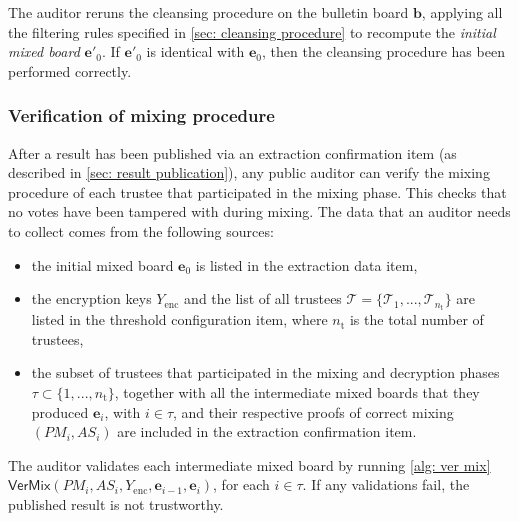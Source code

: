 The auditor reruns the cleansing procedure on the bulletin board $\boldsymbol{b}$, applying all the filtering rules specified in \cref{sec: cleansing procedure} to recompute the \textit{initial mixed board} $\boldsymbol{e'}_0$. If $\boldsymbol{e'}_0$ is identical with $\boldsymbol{e}_0$, then the cleansing procedure has been performed correctly.


\subsubsection{Verification of mixing procedure} \label{sec: verification of mixing procedure}
After a result has been published via an extraction confirmation item (as described in \cref{sec: result publication}), any public auditor can verify the mixing procedure of each trustee that participated in the mixing phase. This checks that no votes have been tampered with during mixing. The data that an auditor needs to collect comes from the following sources:
\begin{itemize}
    \item the initial mixed board $\boldsymbol{e}_0$ is listed in the extraction data item,
    \item the encryption keys $Y_\mathrm{enc}$ and the list of all trustees $\boldsymbol{\mathcal{T}} = \{ \mathcal{T}_1, ..., \mathcal{T}_{n_\mathrm{t}} \}$ are listed in the threshold configuration item, where $n_\mathrm{t}$ is the total number of trustees,
    \item the subset of trustees that participated in the mixing and decryption phases $\tau \subset \{ 1, ..., n_\mathrm{t} \}$, together with all the intermediate mixed boards that they produced $\boldsymbol{e}_i$, with $i \in \tau$, and their respective proofs of correct mixing $(PM_i, AS_i)$ are included in the extraction confirmation item.
\end{itemize}

The auditor validates each intermediate mixed board by running \cref{alg: ver mix} $\mathsf{VerMix} (PM_i, AS_i, Y_\mathrm{enc}, \boldsymbol{e}_{i-1}, \boldsymbol{e}_i)$, for each $i \in \tau$. If any validations fail, the published result is not trustworthy.


